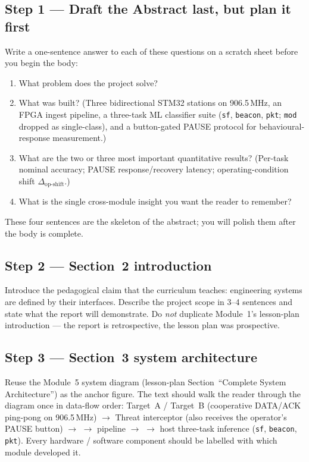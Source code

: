 \documentclass[11pt,letterpaper]{article}
\begin{document}
\subsection{Step 1 --- Draft the Abstract last, but plan it first}
Write a one-sentence answer to each of these questions on a scratch sheet before you begin the body:
\begin{enumerate}[leftmargin=2em]
	\item What problem does the project solve?
	\item What was built? (Three bidirectional STM32 stations on 906.5\,MHz, an FPGA ingest pipeline, a three-task ML classifier suite (\texttt{sf}, \texttt{beacon}, \texttt{pkt}; \texttt{mod} dropped as single-class), and a button-gated PAUSE protocol for behavioural-response measurement.)
	\item What are the two or three most important quantitative results? (Per-task nominal accuracy; PAUSE response/recovery latency; operating-condition shift $\Delta_{\text{op-shift}}$.)
	\item What is the single cross-module insight you want the reader to remember?
\end{enumerate}
These four sentences are the skeleton of the abstract; you will polish them after the body is complete.

\subsection{Step 2 --- Section~2 introduction}
Introduce the pedagogical claim that the curriculum teaches: engineering systems are defined by their interfaces. Describe the project scope in 3--4 sentences and state what the report will demonstrate. Do \emph{not} duplicate Module~1's lesson-plan introduction --- the report is retrospective, the lesson plan was prospective.

\subsection{Step 3 --- Section~3 system architecture}
Reuse the Module~5 system diagram (lesson-plan Section~``Complete System Architecture'') as the anchor figure. The text should walk the reader through the diagram once in data-flow order: Target~A / Target~B (cooperative DATA/ACK ping-pong on 906.5\,MHz) $\to$ Threat interceptor (also receives the operator's PAUSE button) $\to$ \UART{} $\to$ \FPGA{} pipeline $\to$ \UART{} $\to$ host three-task inference (\texttt{sf}, \texttt{beacon}, \texttt{pkt}). Every hardware / software component should be labelled with which module developed it.
\end{document}
